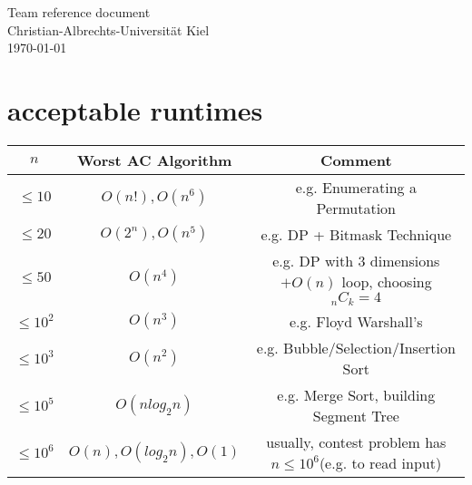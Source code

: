 \documentclass{article}
\begin{document}
\begin{titlepage}
  \centering
  \large
  \vspace*{\fill}
  \vspace{0.5\baselineskip}
  Team reference document\\
  \vspace{2.5\baselineskip}
  Christian-Albrechts-Universität Kiel \\
  \vspace{2\baselineskip}
  \today \\
  \vspace*{\fill}
\end{titlepage}
      
\begin{multicols*}{2}
  
  
  
    
\end{multicols*}

\section{acceptable runtimes}
\begin{table*}[h]
	\centering
	\begin{tabular}[t]{c c c}
		\hline
		$n$ & Worst AC Algorithm & Comment\\ [0.5ex]
		\hline
		\hline
		$\leq 10$ & $O(n!), O(n^6)$ & e.g. Enumerating a Permutation\\
		\hline
		$\leq 20$ & $O(2^n), O(n^5)$ & e.g. DP + Bitmask Technique\\
		\hline
		$\leq 50$ & $O(n^4)$ & e.g. DP with $3$ dimensions $+O(n)$ loop, choosing $_nC_k=4$\\
		\hline
		$\leq 10^2$ & $O(n^3)$ & e.g. Floyd Warshall’s\\
		\hline
		$\leq 10^3$ & $O(n^2)$ & e.g. Bubble/Selection/Insertion Sort\\
		\hline
		$\leq 10^5$ & $O(n log_2 n)$ & e.g. Merge Sort, building Segment Tree\\
		\hline
		$\leq 10^6$ & $O(n),O(log_2n),O(1)$ & usually, contest problem has $n\leq 10^6$(e.g. to read input)\\
		\hline
	\end{tabular}
\end{table*}
\end{document}

